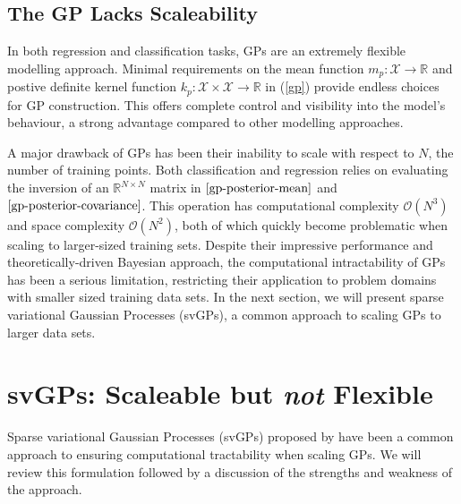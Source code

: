 \documentclass{article}
\numberwithin{equation}{section}
\begin{document}
\subsection{The GP Lacks Scaleability}
In both regression and classification tasks, GPs are an extremely flexible modelling approach. Minimal requirements on the mean function $m_p: \mathcal{X} \rightarrow \mathbb{R}$ and postive definite kernel function $k_p: \mathcal{X} \times \mathcal{X} \rightarrow \mathbb{R}$ in (\ref{gp}) provide endless choices for GP construction. This offers complete control and visibility into the model's behaviour, a strong advantage compared to other modelling approaches. 

A major drawback of GPs has been their inability to scale with respect to $N$, the number of training points. Both classification and regression relies on evaluating the inversion of an $\mathbb{R}^{N \times N}$ matrix in $\ref{gp-posterior-mean}$ and $\ref{gp-posterior-covariance}$. This operation has computational complexity $\mathcal{O}(N^3)$ and space complexity $\mathcal{O}(N^2)$, both of which quickly become problematic when scaling to larger-sized training sets. Despite their impressive performance and theoretically-driven Bayesian approach, the computational intractability of GPs has been a serious limitation, restricting their application to problem domains with smaller sized training data sets. In the next section, we will present sparse variational Gaussian Processes (svGPs), a common approach to scaling GPs to larger data sets.


\newpage
\section{svGPs: Scaleable but \textit{not} Flexible}
Sparse variational Gaussian Processes (svGPs) proposed by \cite{titsias2009variational} have been a common approach to ensuring computational tractability when scaling GPs. We will review this formulation followed by a discussion of the strengths and weakness of the approach.
\end{document}

